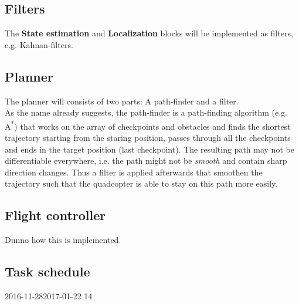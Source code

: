 \documentclass[a4paper,footsepline]{scrartcl}
\begin{document}
\subsection*{Filters}
The \textbf{State estimation} and \textbf{Localization} blocks will be implemented as filters, e.g. Kalman-filters.
\subsection*{Planner}
The planner will consists of two parts: A path-finder and a filter.\\
As the name already suggests, the path-finder is a path-finding algorithm (e.g. A\textsuperscript{*}) that works on the array of checkpoints and obstacles and finds the shortest trajectory starting from the staring position, passes through all the checkpoints and ends in the target position (last checkpoint). The resulting path may not be differentiable everywhere, i.e. the path might not be \emph{smooth} and contain sharp direction changes. Thus a filter is applied afterwards that smoothen the trajectory such that the quadcopter is able to stay on this path more easily.
\subsection*{Flight controller}
Dunno how this is implemented.
\FloatBarrier
\begin{landscape}
\section*{Task schedule}
\begin{ganttchart}[
	hgrid,
	vgrid,
	x unit=4mm,
	time slot format=isodate
	]{2016-11-28}{2017-01-22}
	14
	 \\
	\\
	\\
\end{ganttchart}\\
\end{landscape}
\end{document}

